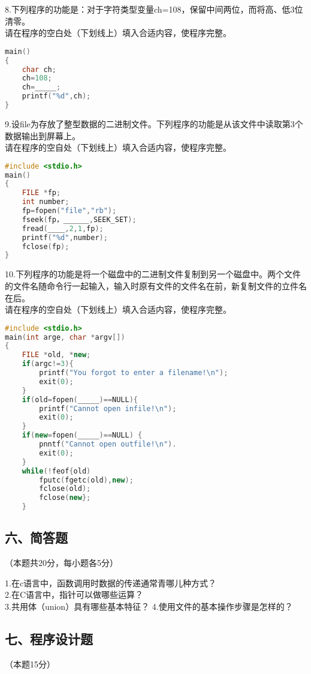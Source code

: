 8.下列程序的功能是：对于字符类型变量ch=108，保留中间两位，而将高、低3位清零。 \\
请在程序的空白处（下划线上）填入合适内容，使程序完整。
\begin{lstlisting}[language=cpp]
main()
{
    char ch;
    ch=108;
    ch=_____;
    printf("%d",ch);
}
\end{lstlisting}

9.设file为存放了整型数据的二进制文件。下列程序的功能是从该文件中读取第3个数据输出到屏幕上。 \\
请在程序的空自处（下划线上）填入合适内容，使程序完整。
\begin{lstlisting}[language=cpp]
#include <stdio.h>
main()
{
    FILE *fp;
    int number;
    fp=fopen("file","rb");
    fseek(fp，______,SEEK_SET);
    fread(____,2,1,fp);
    printf("%d",number);
    fclose(fp);
}
\end{lstlisting}

10.下列程序的功能是将一个磁盘中的二进制文件复制到另一个磁盘中。两个文件的文件名随命令行一起输入，输入时原有文件的文件名在前，新复制文件的立件名在后。 \\
请在程序的空自处（下划线上）填入合适内容，使程序完整。
\begin{lstlisting}[language=cpp]
#include <stdio.h>
main(int arge, char *argv[])
{
    FILE *old, *new;
    if(argc!=3){
        printf("You forgot to enter a filename!\n");
        exit(0);
    }
    if(old=fopen(_____)==NULL){
        printf("Cannot open infile!\n");
        exit(0);
    }
    if(new=fopen(_____)==NULL) {
        pnntf("Cannot open outfile!\n").
        exit(0);
    }
    while(!feof{old)
        fputc(fgetc(old),new);
        fclose(old);
        fclose(new};
    }
\end{lstlisting}

\subsection{六、简答题}
（本题共20分，每小题各5分）

1.在c语言中，函数调用时数据的传递通常青哪儿种方式？ \\
2.在C语言中，指针可以做哪些运算？ \\
3.共用体（union）具有哪些基本特征？
4.使用文件的基本操作步骤是怎样的？

\subsection{七、程序设计题}
（本题15分）

